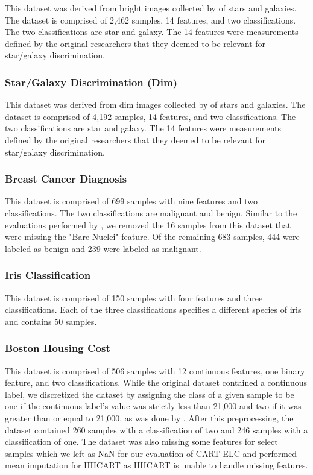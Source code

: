 \documentclass[10pt]{article} %
\begin{document}
This dataset was derived from bright images collected by \citet{odewahn} of stars and galaxies. The dataset is comprised of 2,462 samples, 14 features, and two classifications. The two classifications are star and galaxy. The 14 features were measurements defined by the original researchers that they deemed to be relevant for star/galaxy discrimination.

\subsubsection{Star/Galaxy Discrimination (Dim)}\label{sg_dim}

This dataset was derived from dim images collected by \citet{odewahn} of stars and galaxies. The dataset is comprised of 4,192 samples, 14 features, and two classifications. The two classifications are star and galaxy. The 14 features were measurements defined by the original researchers that they deemed to be relevant for star/galaxy discrimination.

\subsubsection{Breast Cancer Diagnosis}\label{Breast Cancer Diagnosis}

This dataset \citep{breast_cancer} is comprised of 699 samples with nine features and two classifications. The two classifications are malignant and benign. Similar to the evaluations performed by \citet{MurthyKS94}, we removed the 16 samples from this dataset that were missing the "Bare Nuclei" feature. Of the remaining 683 samples, 444 were labeled as benign and 239 were labeled as malignant.

\subsubsection{Iris Classification}\label{iris}

This dataset \citep{iris} is comprised of 150 samples with four features and three classifications. Each of the three classifications specifies a different species of iris and contains 50 samples.

\subsubsection{Boston Housing Cost}\label{housing}

This dataset \citep{boston} is comprised of 506 samples with 12 continuous features, one binary feature, and two classifications. While the original dataset contained a continuous label, we discretized the dataset by assigning the class of a given sample to be one if the continuous label's value was strictly less than 21,000 and two if it was greater than or equal to 21,000, as was done by \citet{MurthyKS94}. After this preprocessing, the dataset contained 260 samples with a classification of two and 246 samples with a classification of one. The dataset was also missing some features for select samples which we left as NaN for our evaluation of CART-ELC and performed mean imputation for HHCART as HHCART is unable to handle missing features.
\end{document}
